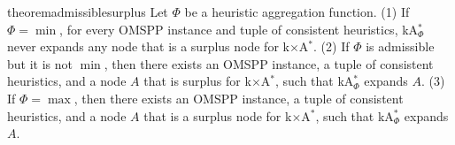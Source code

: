 \documentclass[smallextended]{svjour3}       %
\newcommand{\omspp}{\ac{OMSPP}\xspace}
\newcommand{\kastarvar}[1]{\textup{kA}$^*_{#1}$\xspace}
\newcommand{\kastarmin}{\kastarvar{\min}}
\newcommand{\kastarphi}{\textup{kA}$^*_{\Phi}$\xspace}
\newcommand{\kxastar}{k$\times$A$^*$\xspace}
\newcommand{\axiomadm}{admissible\xspace}
\newcommand{\vect}[1]{\mathbf{#1}}
\begin{document}
\begin{restatable}{theorem}{admissiblesurplus}
  \label{the:kastarmin-surplus}
  Let $\Phi$ be a heuristic aggregation function. %
  (1) If $\Phi=\min$, for every \omspp instance and tuple of consistent heuristics, \kastarphi never expands any node that is a surplus node for \kxastar.
  (2) If $\Phi$ is \axiomadm but it is not $\min$, then there exists an \omspp instance, a tuple of consistent heuristics, and a node $A$ that is surplus for \kxastar, such that \kastarphi expands $A$.
  (3) If $\Phi=\max$, then there exists an \omspp instance, a tuple of consistent heuristics, and a node $A$ that is a surplus node for \kxastar, such that \kastarphi expands $A$.
\end{restatable}
\end{document}
